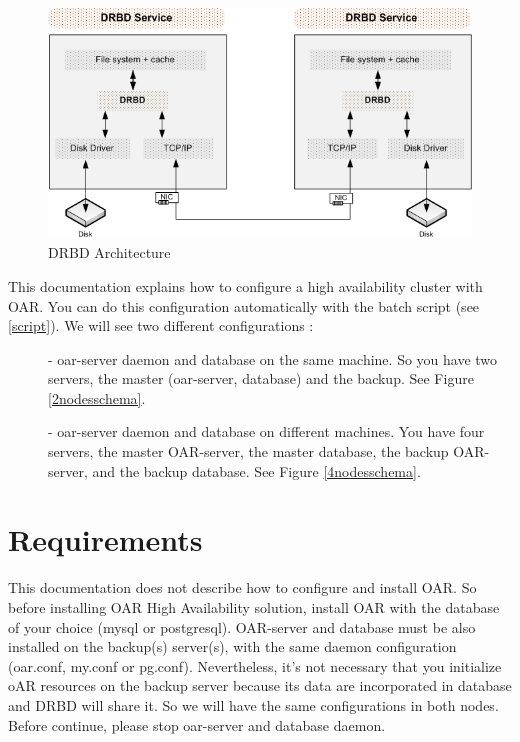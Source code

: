 \documentclass[a4paper,10pt]{report}
\begin{document}
\begin{figure}
\begin{center}
\includegraphics[scale=0.5]{schema/DRBD.png}
\end{center}
\caption{DRBD Architecture} 
\label{drbd} 
\end{figure} 



This documentation explains how to configure a high availability cluster with OAR. You can do this configuration automatically with the batch script (see \ref{script}). We will see two different configurations :
\begin{description}
\item[]- oar-server daemon and database on the same machine. So you have two servers, the master (oar-server, database) and the backup. See Figure \ref{2nodesschema}.


\item[]- oar-server daemon and database on different machines. You have four servers, the master OAR-server, the master database, the backup OAR-server, and the backup database.
See Figure \ref{4nodesschema}.

\end{description}


\section{Requirements}
This documentation does not describe how to configure and install OAR. So before installing OAR High Availability solution, 
install OAR with the database of your choice (mysql or postgresql). OAR-server and database must be also installed on the backup(s) server(s), 
with the same daemon configuration (oar.conf, my.conf or pg.conf). 
Nevertheless, it's not necessary that you initialize oAR resources on the backup server because its data are incorporated in database and DRBD will share it. So we will have the same configurations in both nodes.
Before continue, please stop oar-server and database daemon.
\end{document}
